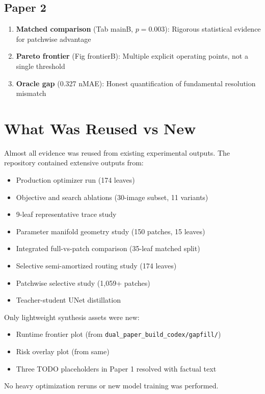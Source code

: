\documentclass[11pt,a4paper]{article}
\begin{document}
\subsection{Paper 2}
\begin{enumerate}
\item \textbf{Matched comparison} (Tab mainB, $p=0.003$): Rigorous statistical evidence for patchwise advantage
\item \textbf{Pareto frontier} (Fig frontierB): Multiple explicit operating points, not a single threshold
\item \textbf{Oracle gap} (0.327 nMAE): Honest quantification of fundamental resolution mismatch
\end{enumerate}

\section{What Was Reused vs New}

Almost all evidence was reused from existing experimental outputs. The repository contained extensive outputs from:
\begin{itemize}
\item Production optimizer run (174 leaves)
\item Objective and search ablations (30-image subset, 11 variants)
\item 9-leaf representative trace study
\item Parameter manifold geometry study (150 patches, 15 leaves)
\item Integrated full-vs-patch comparison (35-leaf matched split)
\item Selective semi-amortized routing study (174 leaves)
\item Patchwise selective study (1,059+ patches)
\item Teacher-student UNet distillation
\end{itemize}

Only lightweight synthesis assets were new:
\begin{itemize}
\item Runtime frontier plot (from \texttt{dual\_paper\_build\_codex/gapfill/})
\item Risk overlay plot (from same)
\item Three TODO placeholders in Paper 1 resolved with factual text
\end{itemize}

No heavy optimization reruns or new model training was performed.
\end{document}
